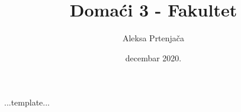 \documentclass[11pt]{article}
\title{\textbf{Domaći 3 - Fakultet}}
\author{Aleksa Prtenjača}
\date{decembar 2020.}
\begin{document}
    \maketitle

    ...template...
\end{document}
